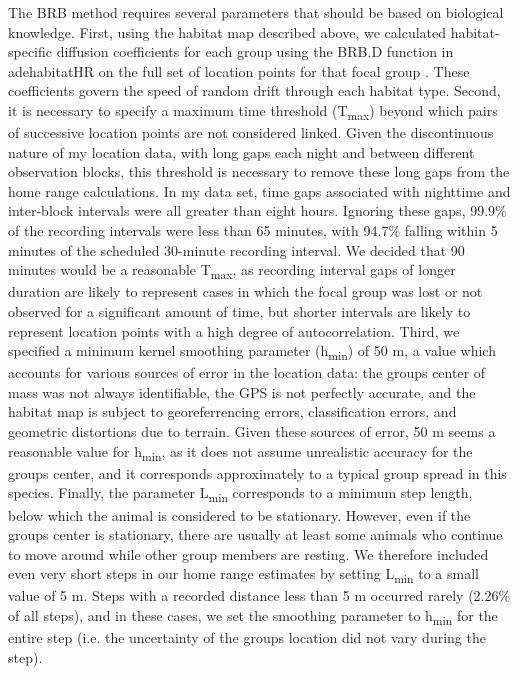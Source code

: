 \documentclass{article}\usepackage[]{graphicx}\usepackage[]{color}
\begin{document}
The BRB method requires several parameters that should be based on biological knowledge. First, using the habitat map described above, we calculated habitat-specific diffusion coefficients for each group using the BRB.D function in adehabitatHR on the full set of location points for that focal group \parencite{Calenge2006}. These coefficients govern the speed of random drift through each habitat type. Second, it is necessary to specify a maximum time threshold (T\textsubscript{max}) beyond which pairs of successive location points are not considered linked. Given the discontinuous nature of my location data, with long gaps each night and between different observation blocks, this threshold is necessary to remove these long gaps from the home range calculations. In my data set, time gaps associated with nighttime and inter-block intervals were all greater than eight hours. Ignoring these gaps, 99.9\% of the recording intervals were less than 65 minutes, with 94.7\% falling within 5 minutes of the scheduled 30-minute recording interval. We decided that 90 minutes would be a reasonable T\textsubscript{max}, as recording interval gaps of longer duration are likely to represent cases in which the focal group was lost or not observed for a significant amount of time, but shorter intervals are likely to represent location points with a high degree of autocorrelation. Third, we specified a minimum kernel smoothing parameter (h\textsubscript{min}) of 50 m, a value which accounts for various sources of error in the location data: the groups center of mass was not always identifiable, the GPS is not perfectly accurate, and the habitat map is subject to georeferrencing errors, classification errors, and geometric distortions due to terrain. Given these sources of error, 50 m seems a reasonable value for h\textsubscript{min}, as it does not assume unrealistic accuracy for the groups center, and it corresponds approximately to a typical group spread in this species. Finally, the parameter L\textsubscript{min} corresponds to a minimum step length, below which the animal is considered to be stationary. However, even if the groups center is stationary, there are usually at least some animals who continue to move around while other group members are resting. We therefore included even very short steps in our home range estimates by setting L\textsubscript{min} to a small value of 5 m. Steps with a recorded distance less than 5 m occurred rarely (2.26\% of all steps), and in these cases, we set the smoothing parameter to h\textsubscript{min} for the entire step (i.e. the uncertainty of the groups location did not vary during the step).
\end{document}
